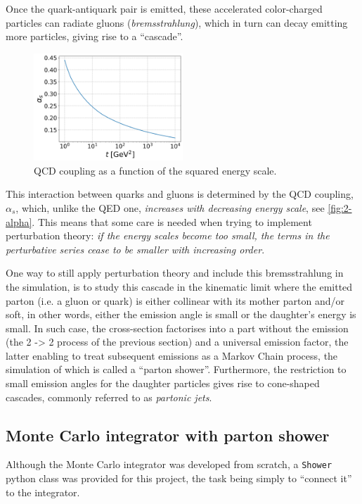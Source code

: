 Once the quark-antiquark pair is emitted, these accelerated color-charged particles can radiate gluons (\textit{bremsstrahlung}), which in turn can decay emitting more particles, giving rise to a “cascade”. 
\begin{figure}
    \centering
    \includegraphics[width=0.5\textwidth]{figures/exercise2a.png}
  \caption{QCD coupling as a function of the squared energy scale.}
  \label{fig:2-alpha}
\end{figure}
This interaction between quarks and gluons is determined by the QCD coupling, $\alpha_{s}$, which, unlike the QED one, \textit{increases with decreasing energy scale}, see \autoref{fig:2-alpha}. This means that some care is needed when trying to implement perturbation theory: \emph{if the energy scales become too small, the terms in the perturbative series cease to be smaller with increasing order}. 

One way to still apply perturbation theory and include this bremsstrahlung in the simulation, is to study this cascade in the kinematic limit where the emitted parton (i.e. a gluon or quark) is either collinear with its mother parton and/or soft, in other words, either the emission angle is small or the daughter's energy is small. In such case, the cross-section factorises into a part without the emission (the 2 -> 2 process of the previous section) and a universal emission factor, the latter enabling to treat subsequent emissions as a Markov Chain process, the simulation of which is called a “parton shower”. Furthermore, the restriction to small emission angles for the daughter particles gives rise to cone-shaped cascades, commonly referred to as \textit{partonic jets}.

\subsection{Monte Carlo integrator with parton shower}

Although the Monte Carlo integrator was developed from scratch, a \texttt{Shower} python class was provided for this project, the task being simply to “connect it” to the integrator.

